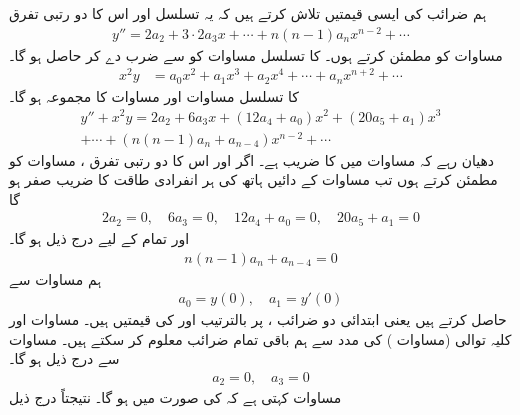 ہم ضرائب    کی ایسی قیمتیں تلاش کرتے ہیں کہ یہ تسلسل اور اس کا دو رتبی تفرق
\begin{align}\label{مساوات_تسلسل_ابتدائی_قیمت_تسلسل_حل_پ}
y''=2a_2+3\cdot 2a_3x+\cdots+n(n-1)a_nx^{n-2}+\cdots
\end{align}
مساوات  کو مطمئن کرتے ہوں۔  کا تسلسل مساوات  کو  سے ضرب دے کر حاصل ہو گا۔
\begin{align}\label{مساوات_تسلسل_ابتدائی_قیمت_تسلسل_حل_ت}
x^2y&=a_0x^2+a_1x^3+a_2x^4+\cdots+a_nx^{n+2}+\cdots
\end{align}
 کا تسلسل  مساوات  اور مساوات  کا مجموعہ ہو گا۔
\begin{multline}\label{مساوات_تسلسل_ابتدائی_قیمت_تسلسل_حل_ٹ}
y''+x^2y=2a_2+6a_3x+(12a_4+a_0)x^2+(20a_5+a_1)x^3\\
+\cdots+(n(n-1)a_n+a_{n-4})x^{n-2}+\cdots
\end{multline}
دھیان رہے کہ مساوات  میں  کا  ضریب   ہے۔ اگر  اور اس کا  دو رتبی  تفرق ،  مساوات  کو مطمئن کرتے ہوں تب مساوات  کے دائیں ہاتھ   کی ہر انفرادی طاقت کا  ضریب  صفر ہو گا
\begin{align}\label{مساوات_تسلسل_ابتدائی_قیمت_تسلسل_حل_ث}
2a_2=0,\quad 6a_3=0,\quad 12a_4+a_0=0,\quad 20a_5+a_1=0
\end{align}
اور تمام  کے لیے درج ذیل ہو گا۔
\begin{align}\label{مساوات_تسلسل_ابتدائی_قیمت_تسلسل_حل_ج}
n(n-1)a_n+a_{n-4}=0
\end{align}
ہم مساوات  سے
\begin{align*}
a_0=y(0),\quad a_1=y'(0)
\end{align*}
حاصل کرتے ہیں یعنی ابتدائی دو  ضرائب ،  پر بالترتیب  اور  کی قیمتیں ہیں۔ مساوات  اور کلیہ توالی (مساوات )  کی مدد سے ہم باقی تمام  ضرائب معلوم کر سکتے ہیں۔ مساوات   سے درج ذیل ہو گا۔
\begin{align*}
a_2=0,\quad a_3=0
\end{align*}
مساوات  کہتی ہے کہ  کی صورت میں  ہو گا۔ نتیجتاً درج ذیل
